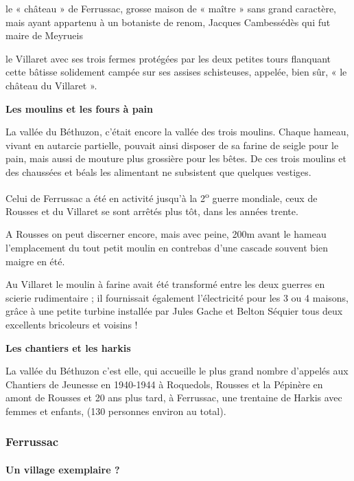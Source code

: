 le « château » de Ferrussac, grosse maison de « maître » sans grand caractère, mais ayant appartenu à
un botaniste de renom, Jacques Cambessédès qui fut maire de Meyrueis

le Villaret avec ses trois fermes protégées par les deux petites tours flanquant cette bâtisse solidement
campée sur ses assises schisteuses, appelée, bien sûr, « le château du Villaret ».

\textbf{Les moulins et les fours à pain}

La vallée du Béthuzon, c’était encore la vallée des trois moulins. Chaque hameau, vivant en autarcie
partielle, pouvait ainsi disposer de sa farine de seigle pour le pain, mais aussi de mouture plus
grossière pour les bêtes. De ces trois moulins et des chaussées et béals les alimentant ne subsistent que
quelques vestiges.

Celui de Ferrussac a été en activité jusqu’à la 2\textsuperscript{o} guerre mondiale, ceux de Rousses et du Villaret se
sont arrêtés plus tôt, dans les années trente.

A Rousses on peut discerner encore, mais avec peine, 200m avant le hameau l’emplacement du tout
petit moulin en contrebas d’une cascade souvent bien maigre en été.

Au Villaret le moulin à farine avait été transformé entre les deux guerres en scierie rudimentaire ; il
fournissait également l’électricité pour les 3 ou 4 maisons, grâce à une petite turbine installée par Jules
Gache et Belton Séquier tous deux excellents bricoleurs et voisins !

\textbf{Les chantiers et les harkis}

La vallée du Béthuzon c’est elle, qui accueille le plus grand nombre
d’appelés aux Chantiers de Jeunesse en 1940-1944 à Roquedols, Rousses et la Pépinère en amont de
Rousses et 20 ans plus tard, à Ferrussac, une trentaine de Harkis avec femmes et enfants, (130
personnes environ au total).


\subsubsection{Ferrussac}{}

\paragraph{Un village exemplaire ?}


